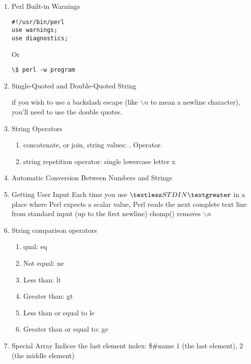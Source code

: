 \documentclass[12pt]{article}
\begin{document}
\maketitle

\begin{enumerate}
\item Perl Built-in Warnings 
\begin{verbatim}
#!/usr/bin/perl
use warnings; 
use diagnostics; 
\end{verbatim}
Or
\begin{verbatim}
\$ perl -w program 
\end{verbatim}

\item Single-Quoted and Double-Quoted String

if you wish to use a backslash escape (like $\backslash n$ to mean a newline character), you'll need to use the double quotes. 

\item String Operators 
\begin{enumerate}
\item concatenate, or join, string values: . Operator. 
\item string repetition operator: single lowercase letter x 
\end{enumerate}

\item Automatic Conversion Between Numbers and Strings 

\item Getting User Input 
Each time you use $\textless STDIN\textgreater$ in a place where Perl expects a scalar value, Perl reads the 
next complete text line from standard input (up to the first newline) 
chomp() removes $\backslash n$ 


\item String comparison operators
\begin{enumerate}
\item qual: eq
\item Not equal: ne
\item Less than: lt
\item Greater than: gt
\item Less than or equal to le
\item Greater than or equal to: ge
\end{enumerate}

\item 
Special Array Indices
the last element index: \$\#name
1 (the last element), 2 (the middle element)


\end{enumerate}
\end{document}
